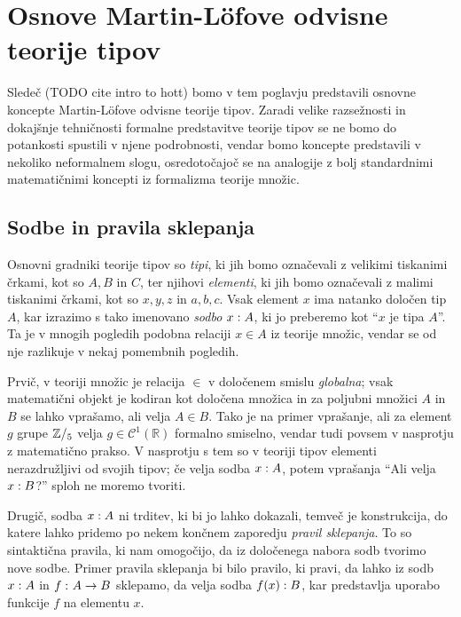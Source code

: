 \section{Osnove Martin-Löfove odvisne teorije tipov}

Sledeč (TODO cite intro to hott) bomo v tem poglavju predstavili osnovne koncepte
Martin-Löfove odvisne teorije tipov. Zaradi velike razsežnosti in dokajšnje tehničnosti
formalne predstavitve teorije tipov se ne bomo do potankosti spustili v njene podrobnosti,
vendar bomo koncepte predstavili v nekoliko neformalnem slogu, osredotočajoč se na
analogije z bolj standardnimi matematičnimi koncepti iz formalizma teorije množic.

\subsection{Sodbe in pravila sklepanja}

Osnovni gradniki teorije tipov so \emph{tipi}, ki jih bomo označevali z velikimi tiskanimi
črkami, kot so \(A, B\) in \(C\), ter njihovi \emph{elementi}, ki jih bomo označevali
z malimi tiskanimi črkami, kot so \(x, y, z\) in \(a, b, c\). Vsak element \(x\) ima
natanko določen tip \(A\), kar izrazimo s tako imenovano \emph{sodbo}
\(x : A\), ki jo preberemo kot ``\(x\) je tipa \(A\)''.
Ta je v mnogih pogledih podobna relaciji \(x \in A\) iz teorije množic, vendar se od
nje razlikuje v nekaj pomembnih pogledih.

Prvič, v teoriji množic je relacija \(\in\) v določenem smislu \emph{globalna};
vsak matematični objekt je kodiran kot določena množica in za poljubni množici \(A\) in
\(B\) se lahko vprašamo, ali velja \(A \in B\). Tako je na primer vprašanje, ali za element
\(g\) grupe \(\mathbb Z/_{5}\) velja \(g \in \mathcal{C}^{1}(\mathbb{R})\) formalno smiselno,
vendar tudi povsem v nasprotju z matematično prakso.
V nasprotju s tem so v teoriji tipov elementi nerazdružljivi od svojih tipov; če velja
sodba \(x : A\), potem vprašanja ``Ali velja \(x : B\)?''
sploh ne moremo tvoriti.

Drugič, sodba \(x : A\) ni trditev, ki bi jo lahko dokazali, temveč je
konstrukcija, do katere lahko pridemo po nekem končnem zaporedju \emph{pravil sklepanja}.
To so sintaktična pravila, ki nam omogočijo, da iz določenega nabora
sodb tvorimo nove sodbe. Primer pravila sklepanja bi bilo pravilo, ki pravi, da
lahko iz sodb \(x : A\) in \(f \,\colon A \to B\) sklepamo, da velja
sodba \(f(x) : B\), kar predstavlja uporabo funkcije \(f\)
na elementu \(x\).

